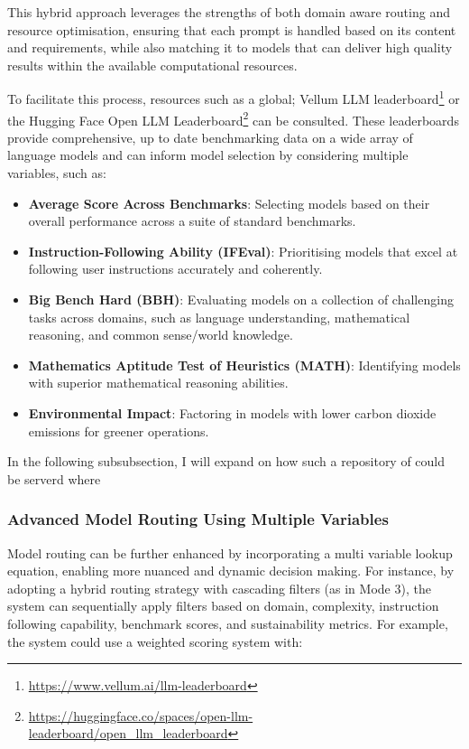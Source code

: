 This hybrid approach leverages the strengths of both domain aware routing and resource optimisation, ensuring that each prompt is handled based on its content and requirements, while also matching it to models that can deliver high quality results within the available computational resources.


To facilitate this process, resources such as a global; Vellum LLM leaderboard\footnote{\url{https://www.vellum.ai/llm-leaderboard}} or the Hugging Face Open LLM Leaderboard\footnote{\url{https://huggingface.co/spaces/open-llm-leaderboard/open_llm_leaderboard}} can be consulted. These leaderboards provide comprehensive, up to date benchmarking data on a wide array of language models and can inform model selection by considering multiple variables, such as:

\begin{itemize}
    \item \textbf{Average Score Across Benchmarks}: Selecting models based on their overall performance across a suite of standard benchmarks.
    \item \textbf{Instruction-Following Ability (IFEval)}: Prioritising models that excel at following user instructions accurately and coherently.
    \item \textbf{Big Bench Hard (BBH)}: Evaluating models on a collection of challenging tasks across domains, such as language understanding, mathematical reasoning, and common sense/world knowledge.
    \item \textbf{Mathematics Aptitude Test of Heuristics (MATH)}: Identifying models with superior mathematical reasoning abilities.
    \item \textbf{Environmental Impact}: Factoring in models with lower carbon dioxide emissions for greener operations.
\end{itemize}

In the following subsubsection, I will expand on how such a repository of could be serverd where 

\subsubsection{Advanced Model Routing Using Multiple Variables}

Model routing can be further enhanced by incorporating a multi variable lookup equation, enabling more nuanced and dynamic decision making. For instance, by adopting a hybrid routing strategy with cascading filters (as in Mode 3), the system can sequentially apply filters based on domain, complexity, instruction following capability, benchmark scores, and sustainability metrics. For example, the system could use a weighted scoring system with:

